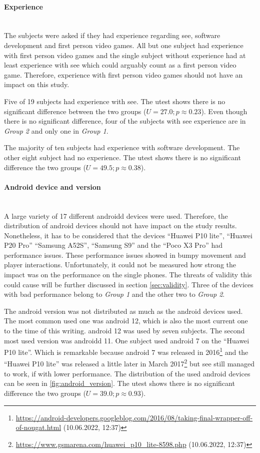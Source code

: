 \paragraph{Experience}\mbox{}\\
The subjects were asked if they had experience regarding \gls{see}, software development and first person video games.
All but one subject had experience with first person video games and the single subject without experience had at least experience with \gls{see} which could arguably count as a first person video game.
Therefore, experience with first person video games should not have an impact on this study.

Five of 19 subjects had experience with \gls{see}.
The \gls{utest} shows there is no significant difference between the two groups ($U = 27.0; p \approx 0.23$).
Even though there is no significant difference, four of the subjects with \gls{see} experience are in \textit{Group 2} and only one in \textit{Group 1}.

The majority of ten subjects had experience with software development.
The other eight subject had no experience.
The \gls{utest} shows there is no significant difference the two groups ($U = 49.5; p \approx 0.38$).

\paragraph{Android device and version}\mbox{}\\
A large variety of 17 different \gls{android}d devices were used.
Therefore, the distribution of \gls{android} devices should not have impact on the study results.
Nonetheless, it has to be considered that the devices \enquote{Huawei P10 lite}, \enquote{Huawei P20 Pro} \enquote{Samsung A52S}, \enquote{Samsung S9} and the \enquote{Poco X3 Pro} had performance issues.
These performance issues showed in bumpy movement and player interactions.
Unfortunately, it could not be measured how strong the impact was on the performance on the single phones.
The threats of validity this could cause will be further discussed in section \ref{sec:validity}.
Three of the devices with bad performance belong to \textit{Group 1} and the other two to \textit{Group 2}.

The \gls{android} version was not distributed as much as the \gls{android} devices used. 
The most common used one was \gls{android} 12, which is also the most current one to the time of this writing.
\gls{android} 12 was used by seven subjects.
The second most used version was \gls{android}d 11.
One subject used \gls{android} 7 on the \enquote{Huawei P10 lite}.
Which is remarkable because \gls{android} 7 was released in 2016\footnote{\url{https://android-developers.googleblog.com/2016/08/taking-final-wrapper-off-of-nougat.html} (10.06.2022, 12:37)} and the \enquote{Huawei P10 lite} was released a little later in March 2017\footnote{\url{https://www.gsmarena.com/huawei_p10_lite-8598.php} (10.06.2022, 12:37)} but \gls{see} still managed to work, if with lower performance.
The distribution of the used \gls{android} devices can be seen in \ref{fig:android_version}.
The \gls{utest} shows there is no significant difference the two groups ($U = 39.0; p \approx 0.93$).


